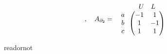 \documentclass[uplatex]{jsarticle}
\begin{document}
\begin{rei}[射影平面の場合]
\begin{equation}
\begin{array}{c@{\,}c}
    \end{array}
    , \quad 
    A_{\partial_{2}} = \begin{array}{c@{\,}c}
      & \begin{array}{cc}
        U & L
      \end{array} \\
      \begin{array}{c}
        a \\ b \\ c
      \end{array} &
      \begin{pmatrix}
      -1 & 1 \\
      1 & -1 \\
      1 & 1
    \end{pmatrix}
  \end{array}
  \end{equation}
\end{rei}

\expandafter\ifx\csname readornot\endcsname\relax
  
\end{document}
